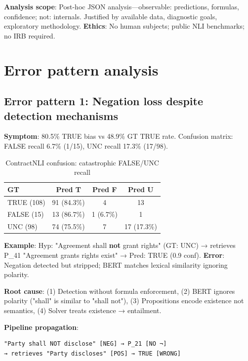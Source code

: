 \documentclass[12pt,a4paper]{article}
\begin{document}
\textbf{Analysis scope}: Post-hoc JSON analysis—observable: predictions, formulas, confidence; not: internals. Justified by available data, diagnostic goals, exploratory methodology. \textbf{Ethics}: No human subjects; public NLI benchmarks; no IRB required.

\section{Error pattern analysis}

\subsection{Error pattern 1: Negation loss despite detection mechanisms}

\textbf{Symptom}: 80.5\% TRUE bias vs 48.9\% GT TRUE rate. Confusion matrix: FALSE recall 6.7\% (1/15), UNC recall 17.3\% (17/98).

\begin{table}[h]
\centering
\small
\begin{tabular}{lccc}
\toprule
\textbf{GT} & \textbf{Pred T} & \textbf{Pred F} & \textbf{Pred U} \\
\midrule
TRUE (108)   & 91 (84.3\%) & 4 & 13 \\
FALSE (15)   & 13 (86.7\%) & 1 (6.7\%) & 1 \\
UNC (98)     & 74 (75.5\%) & 7 & 17 (17.3\%) \\
\bottomrule
\end{tabular}
\caption{ContractNLI confusion: catastrophic FALSE/UNC recall}
\end{table}

\textbf{Example}: Hyp: "Agreement shall \textbf{not} grant rights" (GT: UNC) → retrieves P\_41 "Agreement grants rights exist" → Pred: TRUE (0.9 conf). \textbf{Error}: Negation detected but stripped; BERT matches lexical similarity ignoring polarity.

\textbf{Root cause}: (1) Detection without formula enforcement, (2) BERT ignores polarity ("shall" is similar to "shall not"), (3) Propositions encode existence not semantics, (4) Solver treats existence → entailment.

\textbf{Pipeline propagation}:
\begin{verbatim}
"Party shall NOT disclose" [NEG] → P_21 [NO ¬] 
→ retrieves "Party discloses" [POS] → TRUE [WRONG]
\end{verbatim}
\end{document}
